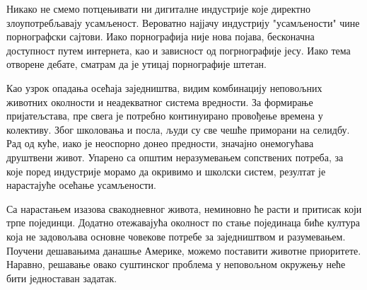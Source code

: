 \documentclass[b5paper]{article}
\begin{document}
Никако не смемо потцењивати ни дигиталне индустрије које директно злоупотребљавају усамљеност. Вероватно најјачу индустрију "усамљености" чине порнографски сајтови. Иако порнографија није нова појава, бесконачна доступност путем интернета, као и зависност од погрнографије јесу. Иако тема отворене дебате, сматрам да је утицај порнографије штетан.

Као узрок опадања осећаја заједништва, видим комбинацију неповољних животних околности и неадекватног система вредности. За формирање пријатељстава, пре свега је потребно континуирано провођење времена у колективу. Због школовања и посла, људи су све чешће приморани на селидбу. Рад од куће, иако је неоспорно донео предности, значајно онемогућава друштвени живот. Упарено са општим неразумевањем сопствених потреба, за које поред индустрије морамо да окривимо и школски систем, резултат је нарастајуће осећање усамљености.

Са нарастањем изазова свакодневног живота, неминовно ће расти и притисак који трпе појединци. Додатно отежавајућа околност по стање појединаца биће култура која не задовољава основне човекове потребе за заједништвом и разумевањем. Поучени дешавањима данашње Америке, можемо поставити животне приоритете. Наравно, решавање овако суштинског проблема у неповољном окружењу неће бити једноставан задатак.
\end{document}
